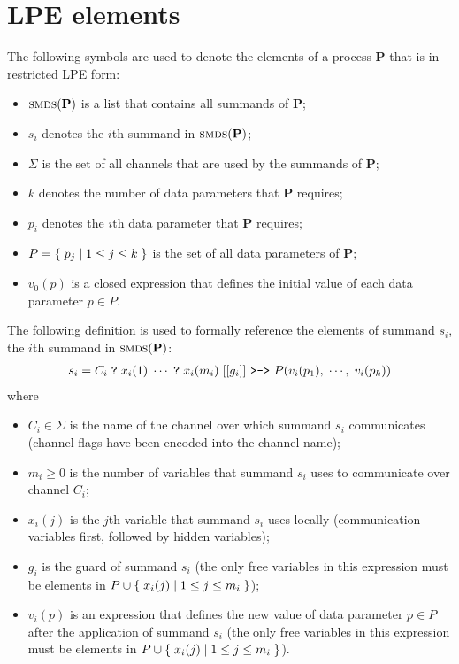 \section{LPE elements} \label{lpe-elements}

The following symbols are used to denote the elements of a process $\mathbf{P}$ that is in restricted LPE form:
\begin{itemize}
\item $\textsc{smds}(\mathbf{P})$ is a list that contains all summands of $\mathbf{P}$;
\item $s_i$ denotes the $i$th summand in $\textsc{smds}(\mathbf{P})$;
\item $\Sigma$ is the set of all channels that are used by the summands of $\mathbf{P}$;
\item $k$ denotes the number of data parameters that $\mathbf{P}$ requires;
\item $p_i$ denotes the $i$th data parameter that $\mathbf{P}$ requires;
\item $P = \{\;p_j\;|\;1 \leq j \leq k\;\}$ is the set of all data parameters of $\mathbf{P}$;
\item $v_0(p)$ is a closed expression that defines the initial value of each data parameter $p \in P$.
\end{itemize}

The following definition is used to formally reference the elements of summand $s_i$, the $i$th summand in $\textsc{smds}(\mathbf{P})$:
\begin{align*}
s_i = C_i \; \texttt{?} \; x_i(1) \; \cdots{} \; \texttt{?} \; x_i(m_i) \; [[g_i]] \text{ \texttt{>->} } P(v_i(p_1),\; \cdots{},\; v_i(p_k))
\end{align*}
where
\begin{itemize}
\item $C_i \in \Sigma$ is the name of the channel over which summand $s_i$ communicates (channel flags have been encoded into the channel name);
\item $m_i \geq 0$ is the number of variables that summand $s_i$ uses to communicate over channel $C_i$;
\item $x_i(j)$ is the $j$th variable that summand $s_i$ uses locally (communication variables first, followed by hidden variables);
\item $g_i$ is the guard of summand $s_i$ (the only free variables in this expression must be elements in $P \cup \{\;x_i(j)\;|\;1 \leq j \leq m_i\;\}$);
\item $v_i(p)$ is an expression that defines the new value of data parameter $p \in P$ after the application of summand $s_i$ (the only free variables in this expression must be elements in $P \cup \{\;x_i(j)\;|\;1 \leq j \leq m_i\;\}$).
\end{itemize}

